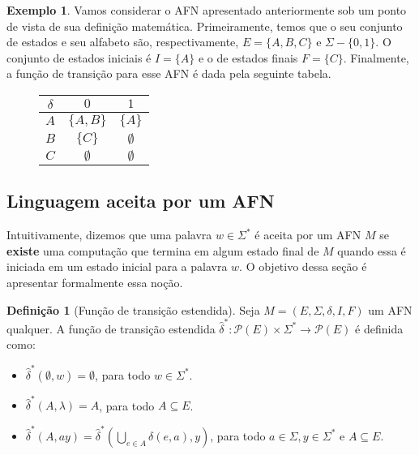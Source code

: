 \documentclass[a4paper]{article}
\theoremstyle{definition}
\newtheorem{Example}{Exemplo}
\newtheorem{Definition}{Definição}
\begin{document}
  \begin{Example}
    Vamos considerar o AFN apresentado anteriormente sob um ponto de vista de
    sua definição matemática. Primeiramente, temos que o seu conjunto de estados
    e seu alfabeto são, respectivamente, $E=\{A,B,C\}$ e $\Sigma-\{0,1\}$. O
    conjunto de estados iniciais é $I=\{A\}$ e o de estados finais $F=\{C\}$.
    Finalmente, a função de transição para esse AFN é dada pela seguinte tabela.
    \begin{figure}[H]
      \begin{tabular}{|c|c|c|}
        \hline
        $\delta$ & $0$      & $1$ \\ \hline
        $A$      &$\{A,B\}$ & $\{A\}$ \\
        $B$      & $\{C\}$  & $\emptyset$ \\
        $C$      & $\emptyset$ & $\emptyset$\\ \hline
      \end{tabular}
      \centering
    \end{figure}
  \end{Example}

  \subsection{Linguagem aceita por um AFN}

  Intuitivamente, dizemos que uma palavra $w\in\Sigma^*$ é aceita por um AFN $M$
  se \textbf{existe} uma computação que termina em algum estado final de $M$
  quando essa é iniciada em um estado inicial para a palavra $w$. O objetivo
  dessa seção é apresentar formalmente essa noção.

  \begin{Definition}[Função de transição estendida]
    Seja $M=(E,\Sigma,\delta,I,F)$ um AFN qualquer. A função de transição
    estendida $\widehat{\delta}^* : \mathcal{P}(E) \times \Sigma^*\to\mathcal{P}(E)$ é
    definida como:
    \begin{itemize}
       \item $\widehat{\delta}^*(\emptyset,w) = \emptyset$, para todo
         $w\in\Sigma^*$.
       \item $\widehat{\delta}^*(A,\lambda) = A$, para todo $A\subseteq E$.
       \item $\widehat{\delta}^*(A,ay) = \widehat{\delta}^*(\bigcup_{e \in
           A}\delta(e,a), y)$, para todo $a\in \Sigma, y \in \Sigma^*$ e $A
         \subseteq E$.
    \end{itemize}
  \end{Definition}
\end{document}
